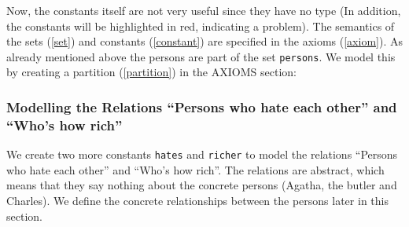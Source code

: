 
Now, the constants itself are not very useful since they have no type (In addition, the constants will be highlighted in red, indicating a problem). The semantics of the sets (\ref{set}) and constants (\ref{constant}) are specified in the axioms (\ref{axiom}). As already mentioned above the persons are part of the set \texttt{persons}. We model this by creating a partition (\ref{partition}) in the \textsf{AXIOMS} section: 




\subsubsection{Modelling the Relations ``Persons who hate each other'' and ``Who's how rich''}

We create two more constants \texttt{hates} and \texttt{richer} to model the relations ``Persons who hate each other'' and ``Who's how rich''. The relations are abstract, which means that they say nothing about the concrete persons (Agatha, the butler and Charles). We define the concrete relationships between the persons later in this section.

